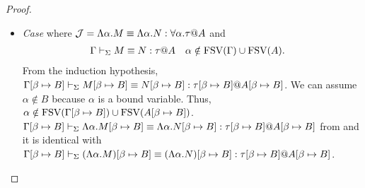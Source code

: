 \begin{proof}
\begin{itemize}
\begin{itemize}
		      \end{itemize}
		      		
		\item \textit{Case} \QGen{} where \(\mathcal{J} = \Lambda\alpha.M \E \Lambda\alpha.N : \forall\alpha.\tau@A\) and 
		      \begin{align*}
		      	  & \G\V M\E N : \tau@A &   & \alpha \notin \FTV(\G)\cup\FTV(A). 
		      \end{align*}
		      From the induction hypothesis, \( \GGV M\SB \E N\SB : \tau\SB@A\SB \).
		      We can assume \(\alpha \notin B \) because \(\alpha\) is a bound variable.
		      Thus, \( \alpha \notin \text{FSV}(\Gamma[\beta \mapsto B])\cup\text{FSV}(A[\beta \mapsto B]) \).
		      \( \GGV \Lambda\alpha.M\SB \E \Lambda\alpha.N\SB : \tau\SB@A\SB \) from \QGen{} and
		      it is identical with \( \GGV (\Lambda\alpha.M)\SB \E (\Lambda\alpha.N)\SB : \tau\SB@A\SB \).
		      		      
	\end{itemize}
\end{proof}

					
					
					
	      	      	      	      	      
	      	      	      	      	      
	      	      	      	      	      
	      	      	      	      	      
	      	      	      	      	      
	      	      	      	      	      
	      	      	      	      	      
	      		      		      		      		      	
